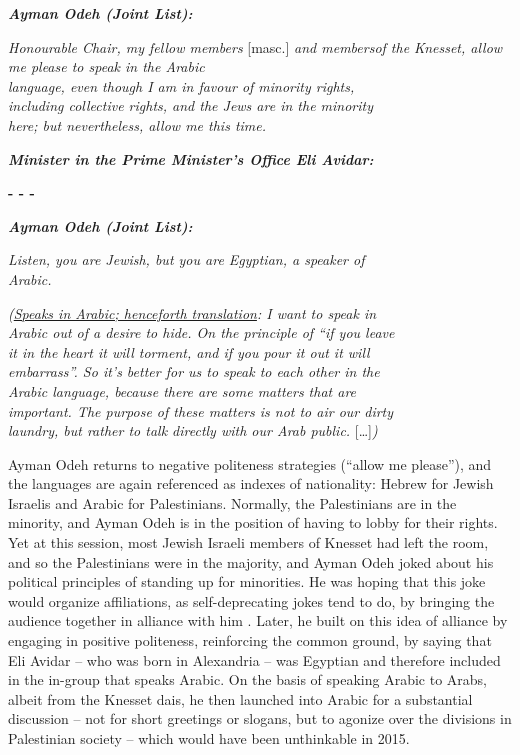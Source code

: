 \documentclass[output=paper,arabicfont]{langscibook}
\begin{document}
\begin{exe} \begin{xlist}
\label{hawker:ex2b}
 \textit{\textbf{Ayman Odeh (Joint List):}}

\textit{Honourable Chair, my fellow members} [masc.] \textit{and members}\newline[fem.] \textit{of the Knesset, allow me please to speak in the Arabic\\
language, even though I am in favour of minority rights,\\
including collective rights, and the Jews are in the minority\\
here; but nevertheless, allow me this time.}

\textbf{\textit{Minister in the Prime Minister’s Office Eli Avidar:}}

\textbf{- - -}

\textbf{\textit{Ayman Odeh (Joint List):}}

\textit{Listen, you are Jewish, but you are Egyptian, a speaker of \\
Arabic.}

\textit{(\ul{Speaks in Arabic; henceforth translation}: I want to speak in \\
Arabic out of a desire to hide. On the principle of “if you leave \\
it in the heart it will torment, and if you pour it out it will \\
embarrass”. So it’s better for us to speak to each other in the \\
Arabic language, because there are some matters that are \\
important. The purpose of these matters is not to air our dirty \\
laundry, but rather to talk directly with our Arab public.} […]\textit{)}
 \end{xlist}
\end{exe}

Ayman Odeh returns to negative politeness strategies (“allow me please”), and the languages are again referenced as indexes of nationality: Hebrew for Jewish Israelis and Arabic for Palestinians. Normally, the Palestinians are in the minority, and Ayman Odeh is in the position of having to lobby for their rights. Yet at this session, most Jewish Israeli members of Knesset had left the room, and so the Palestinians were in the majority, and Ayman Odeh joked about his political principles of standing up for minorities. He was hoping that this joke would organize affiliations, as self-deprecating jokes tend to do, by bringing the audience together in alliance with him \citep[318–319]{meyer2000a}. Later, he built on this idea of alliance by engaging in positive politeness, reinforcing the common ground, by saying that Eli Avidar – who was born in Alexandria – was Egyptian and therefore included in the in-group that speaks Arabic. On the basis of speaking Arabic to Arabs, albeit from the Knesset dais, he then launched into Arabic for a substantial discussion – not for short greetings or slogans, but to agonize over the divisions in Palestinian society – which would have been unthinkable in 2015.
\end{document}

